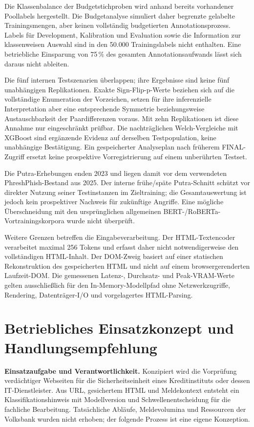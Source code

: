 Die Klassenbalance der Budgetstichproben wird anhand bereits vorhandener Poollabels
hergestellt. Die Budgetanalyse simuliert daher begrenzte gelabelte Trainingsmengen,
aber keinen vollständig budgetierten Annotationsprozess. Labels für Development,
Kalibration und Evaluation sowie die Information zur klassenweisen Auswahl sind in
den 50.000 Trainingslabels nicht enthalten. Eine betriebliche Einsparung von 75\,\%
des gesamten Annotationsaufwands lässt sich daraus nicht ableiten.

Die fünf internen Testszenarien überlappen; ihre Ergebnisse sind keine fünf
unabhängigen Replikationen. Exakte Sign-Flip-p-Werte beziehen sich auf die vollständige
Enumeration der Vorzeichen, setzen für ihre inferenzielle Interpretation aber eine
entsprechende Symmetrie beziehungsweise Austauschbarkeit der Paardifferenzen voraus.
Mit zehn Replikationen ist diese Annahme nur eingeschränkt prüfbar. Die nachträglichen
Welch-Vergleiche mit XGBoost sind ergänzende Evidenz auf derselben Testpopulation,
keine unabhängige Bestätigung. Ein gespeicherter Analyseplan nach früherem FINAL-Zugriff
ersetzt keine prospektive Vorregistrierung auf einem unberührten Testset.

Die Putra-Erhebungen enden 2023 und liegen damit vor dem verwendeten PhreshPhish-Bestand
aus 2025. Der interne frühe/späte Putra-Schnitt schützt vor direkter Nutzung seiner
Testinstanzen im Zieltraining; die Gesamtauswertung ist jedoch kein prospektiver
Nachweis für zukünftige Angriffe. Eine mögliche Überschneidung mit den ursprünglichen
allgemeinen BERT-/RoBERTa-Vortrainingskorpora wurde nicht überprüft.

Weitere Grenzen betreffen die Eingabeverarbeitung. Der HTML-Textencoder verarbeitet maximal
256 Tokens und erfasst daher nicht notwendigerweise den vollständigen HTML-Inhalt. Der
DOM-Zweig basiert auf einer statischen Rekonstruktion des gespeicherten HTML und nicht auf
einem browsergerenderten Laufzeit-DOM. Die gemessenen Latenz-, Durchsatz- und
Peak-VRAM-Werte gelten ausschließlich für den In-Memory-Modellpfad ohne Netzwerkzugriffe,
Rendering, Datenträger-I/O und vorgelagertes HTML-Parsing.


\section{Betriebliches Einsatzkonzept und Handlungsempfehlung}
\label{sec:betriebskonzept}

\textbf{Einsatzaufgabe und Verantwortlichkeit.}
Konzipiert wird die Vorprüfung verdächtiger Webseiten für die Sicherheitseinheit eines
Kreditinstituts oder dessen IT-Dienstleister. Aus URL, gesichertem HTML und Meldekontext
entsteht ein Klassifikationshinweis mit Modellversion und Schwellenentscheidung für die
fachliche Bearbeitung. Tatsächliche Abläufe, Meldevolumina und Ressourcen der Volksbank
wurden nicht erhoben; der folgende Prozess ist eine eigene Konzeption.

